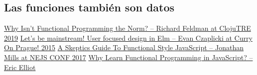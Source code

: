 \documentclass{article}
\begin{document}
\subsection*{Las funciones también son datos}


\pagebreak
\begin{thebibliography}{99}
   \href{https://youtu.be/QyJZzq0v7Z4}{Why Isn't Functional Programming the Norm? – Richard Feldman at ClojuTRE 2019}
   \href{https://youtu.be/oYk8CKH7OhE?t=2133}{Let's be mainstream! User focused design in Elm – Evan Czaplicki at Curry On Prague! 2015}
   \href{https://youtu.be/oF9XTJoScOE?t=1253}{A Skeptics Guide To Functional Style JavaScript – Jonathan Mills at NEJS CONF 2017}
   \href{https://medium.com/javascript-scene/why-learn-functional-programming-in-javascript-composing-software-ea13afc7a257}{Why Learn Functional Programming in JavaScript? – Eric Elliot}
\end{thebibliography}
\end{document}
